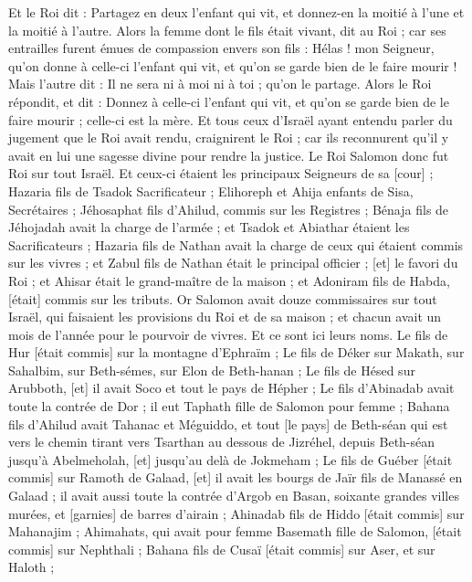 \begin{multicols}{2}
Et le Roi dit : Partagez en deux l'enfant qui vit, et donnez-en la moitié à l'une et la moitié à l'autre.
Alors la femme dont le fils était vivant, dit au Roi ; car ses entrailles furent émues de compassion envers son fils : Hélas ! mon Seigneur, qu'on donne à celle-ci l'enfant qui vit, et qu'on se garde bien de le faire mourir ! Mais l'autre dit : Il ne sera ni à moi ni à toi ; qu'on le partage.
Alors le Roi répondit, et dit : Donnez à celle-ci l'enfant qui vit, et qu'on se garde bien de le faire mourir ; celle-ci est la mère.
Et tous ceux d'Israël ayant entendu parler du jugement que le Roi avait rendu, craignirent le Roi ; car ils reconnurent qu'il y avait en lui une sagesse divine pour rendre la justice.
\VerseOne{}Le Roi Salomon donc fut Roi sur tout Israël.
Et ceux-ci étaient les principaux Seigneurs de sa [cour] ; Hazaria fils de Tsadok Sacrificateur ;
Elihoreph et Ahija enfants de Sisa, Secrétaires ; Jéhosaphat fils d'Ahilud, commis sur les Registres ;
Bénaja fils de Jéhojadah avait la charge de l'armée ; et Tsadok et Abiathar étaient les Sacrificateurs ;
Hazaria fils de Nathan avait la charge de ceux qui étaient commis sur les vivres ; et Zabul fils de Nathan était le principal officier ; [et] le favori du Roi ;
et Ahisar était le grand-maître de la maison ; et Adoniram fils de Habda, [était] commis sur les tributs.
Or Salomon avait douze commissaires sur tout Israël, qui faisaient les provisions du Roi et de sa maison ; et chacun avait un mois de l'année pour le pourvoir de vivres.
Et ce sont ici leurs noms. Le fils de Hur [était commis] sur la montagne d'Ephraïm ;
Le fils de Déker sur Makath, sur Sahalbim, sur Beth-sémes, sur Elon de Beth-hanan ;
Le fils de Hésed sur Arubboth, [et] il avait Soco et tout le pays de Hépher ;
Le fils d'Abinadab avait toute la contrée de Dor ; il eut Taphath fille de Salomon pour femme ;
Bahana fils d'Ahilud avait Tahanac et Méguiddo, et tout [le pays] de Beth-séan qui est vers le chemin tirant vers Tsarthan au dessous de Jizréhel, depuis Beth-séan jusqu'à Abelmeholah, [et] jusqu'au delà de Jokmeham ;
Le fils de Guéber [était commis] sur Ramoth de Galaad, [et] il avait les bourgs de Jaïr fils de Manassé en Galaad ; il avait aussi toute la contrée d'Argob en Basan, soixante grandes villes murées, et [garnies] de barres d'airain ;
Ahinadab fils de Hiddo [était commis] sur Mahanajim ;
Ahimahats, qui avait pour femme Basemath fille de Salomon, [était commis] sur Nephthali ;
Bahana fils de Cusaï [était commis] sur Aser, et sur Haloth ;

\end{multicols}
